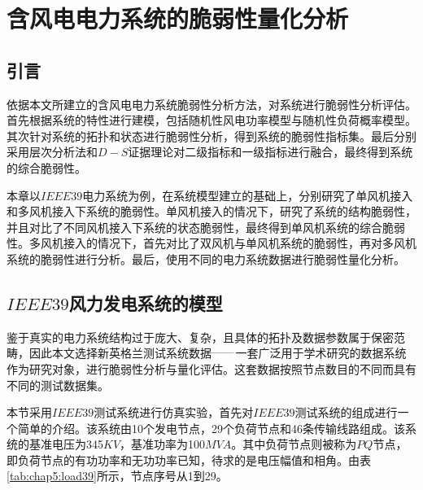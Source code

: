 \chapter{含风电电力系统的脆弱性量化分析}
\label{cha:quantiAnaly}

\section{引言}
\label{sec:index5}
依据本文所建立的含风电电力系统脆弱性分析方法，对系统进行脆弱性分析评估。首先根据系统的特性进行建模，包括随机性风电功率模型与随机性负荷概率模型。其次针对系统的拓扑和状态进行脆弱性分析，得到系统的脆弱性指标集。最后分别采用层次分析法和$D-S$证据理论对二级指标和一级指标进行融合，最终得到系统的综合脆弱性。

本章以$IEEE39$电力系统为例，在系统模型建立的基础上，分别研究了单风机接入和多风机接入下系统的脆弱性。单风机接入的情况下，研究了系统的结构脆弱性，并且对比了不同风机接入下系统的状态脆弱性，最终得到单风机系统的综合脆弱性。多风机接入的情况下，首先对比了双风机与单风机系统的脆弱性，再对多风机系统的脆弱性进行分析。最后，使用不同的电力系统数据进行脆弱性量化分析。
\section{$IEEE39$风力发电系统的模型}
\label{sec:modelIntroduce}
鉴于真实的电力系统结构过于庞大、复杂，且具体的拓扑及数据参数属于保密范畴，因此本文选择新英格兰测试系统数据$\raisebox{0.5mm}{------}$一套广泛用于学术研究的数据系统作为研究对象，进行脆弱性分析与量化评估。这套数据按照节点数目的不同而具有不同的测试数据集。

本节采用$IEEE39$测试系统进行仿真实验，首先对$IEEE39$测试系统的组成进行一个简单的介绍。该系统由10个发电节点，29个负荷节点和46条传输线路组成。该系统的基准电压为345$KV$，基准功率为100$MVA$。其中负荷节点则被称为$PQ$节点，即负荷节点的有功功率和无功功率已知，待求的是电压幅值和相角。由表\ref{tab:chap5:load39}所示，节点序号从1到29。

